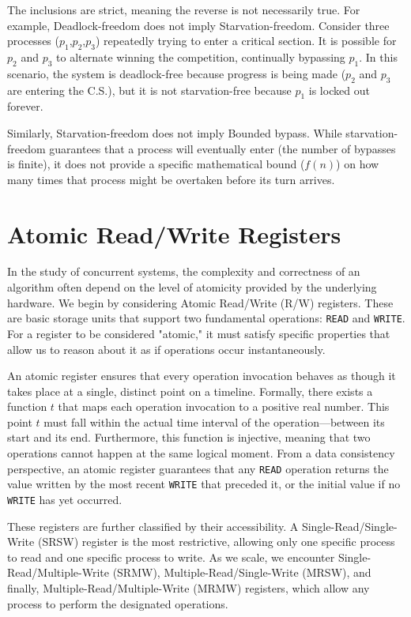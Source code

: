 The inclusions are strict, meaning the reverse is not necessarily true. For example, Deadlock-freedom does not imply Starvation-freedom. Consider three processes ($p_1$,$p_2$,$p_3$) repeatedly trying to enter a critical section. It is possible for $p_2$ and $p_3$ to alternate winning the competition, continually bypassing $p_1$. In this scenario, the system is deadlock-free because progress is being made ($p_2$ and $p_3$ are entering the C.S.), but it is not starvation-free because $p_1$ is locked out forever.

Similarly, Starvation-freedom does not imply Bounded bypass. While starvation-freedom guarantees that a process will eventually enter (the number of bypasses is finite), it does not provide a specific mathematical bound ($f(n)$) on how many times that process might be overtaken before its turn arrives.

\section{Atomic Read/Write Registers}
In the study of concurrent systems, the complexity and correctness of an algorithm often depend on the level of atomicity provided by the underlying hardware. We begin by considering Atomic Read/Write (R/W) registers. These are basic storage units that support two fundamental operations: \texttt{READ} and \texttt{WRITE}. For a register to be considered "atomic," it must satisfy specific properties that allow us to reason about it as if operations occur instantaneously.

An atomic register ensures that every operation invocation behaves as though it takes place at a single, distinct point on a timeline. Formally, there exists a function $t$ that maps each operation invocation to a positive real number. This point $t$ must fall within the actual time interval of the operation—between its start and its end. Furthermore, this function is injective, meaning that two operations cannot happen at the same logical moment. From a data consistency perspective, an atomic register guarantees that any \texttt{READ} operation returns the value written by the most recent \texttt{WRITE} that preceded it, or the initial value if no \texttt{WRITE} has yet occurred.

These registers are further classified by their accessibility. A Single-Read/Single-Write (SRSW) register is the most restrictive, allowing only one specific process to read and one specific process to write. As we scale, we encounter Single-Read/Multiple-Write (SRMW), Multiple-Read/Single-Write (MRSW), and finally, Multiple-Read/Multiple-Write (MRMW) registers, which allow any process to perform the designated operations.

